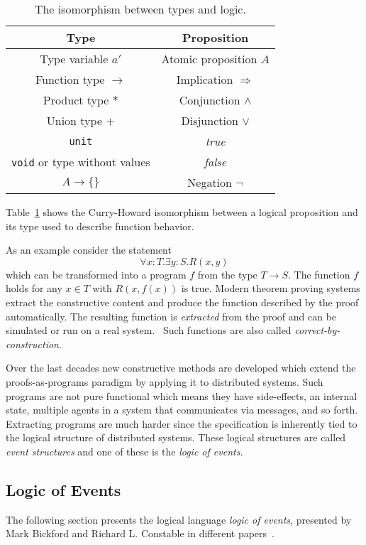 \begin{table}[h]
  \centering
  \begin{tabular}{c|c}
    Type & Proposition\\\hline
    Type variable $a'$ & Atomic proposition $A$\\
    Function type $\rightarrow$ & Implication $\Rightarrow$\\
    Product type $*$ & Conjunction $\wedge$\\
    Union type $+$ & Disjunction $\vee$\\
    \texttt{unit} & \textit{true} \\
    \texttt{void} or type without values & \textit{false}\\
    $A\rightarrow \{\}$ & Negation $\neg$ \\
  \end{tabular}
  \caption{The isomorphism between types and logic.}
  \label{tab:proofsasprogs}
\end{table}

Table~\ref{tab:proofsasprogs} shows the Curry-Howard isomorphism between
a logical proposition and its type used to describe function behavior.

As an example consider the statement
\[
  \forall x:T.\exists y:S.R(x,y)
\]
which can be transformed into a program $f$ from the type $T\rightarrow S$.
The function $f$ holds for any $x\in T$ with $R(x,f(x))$ is true.
Modern theorem proving systems extract the constructive content and
produce the function described by the proof automatically.
The resulting function is \textit{extracted} from the proof
and can be simulated or run on a real system.~\cite{bickford2009component}
Such functions are also called \textit{correct-by-construction}.

Over the last decades new constructive methods are developed which
extend the proofs-as-programs paradigm by applying it to distributed
systems. Such programs are not pure functional which means they have
side-effects, an internal state, multiple agents in a system that
communicates via messages, and so forth. Extracting programs
are much harder since the specification is inherently tied to
the logical structure of distributed systems. These logical
structures are called \textit{event structures} and one of these
is the \textit{logic of events}.~\cite{bickford2009component}

\subsection{Logic of Events}
The following section presents the logical language \textit{logic of events},
presented by Mark Bickford and Richard L. Constable in different
papers~\cite{bickford2003logic, bickford2005causal, bickford2009component}.

